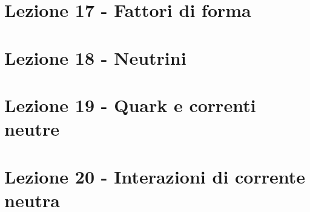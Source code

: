 \documentclass[11pt,a4paper]{book}
\renewcommand{\(}{\left(}
\renewcommand{\)}{\right)}
\begin{document}
\chapter{Lezione 17 - Fattori di forma}
\clearpage{\thispagestyle{empty}\cleardoublepage}
\chapter{Lezione 18 - Neutrini}
\clearpage{\thispagestyle{empty}\cleardoublepage}
\chapter{Lezione 19 - Quark e correnti neutre}
\clearpage{\thispagestyle{empty}\cleardoublepage}
\chapter{Lezione 20 - Interazioni di corrente neutra}
\clearpage{\thispagestyle{empty}\cleardoublepage}
\end{document}
